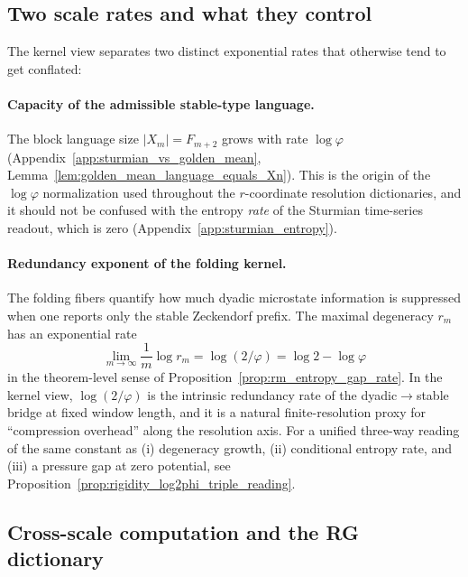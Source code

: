 \subsection{Two scale rates and what they control}
\label{subsec:kernel_scale_rates}

The kernel view separates two distinct exponential rates that otherwise tend to get conflated:

\paragraph{Capacity of the admissible stable-type language.}
The block language size $|X_m|=F_{m+2}$ grows with rate $\log\varphi$ (Appendix~\ref{app:sturmian_vs_golden_mean}, Lemma~\ref{lem:golden_mean_language_equals_Xn}).
This is the origin of the $\log\varphi$ normalization used throughout the $r$-coordinate resolution dictionaries, and it should not be confused with the entropy \emph{rate} of the Sturmian time-series readout, which is zero (Appendix~\ref{app:sturmian_entropy}).

\paragraph{Redundancy exponent of the folding kernel.}
The folding fibers quantify how much dyadic microstate information is suppressed when one reports only the stable Zeckendorf prefix.
The maximal degeneracy $r_m$ has an exponential rate
\[
\lim_{m\to\infty}\frac{1}{m}\log r_m=\log(2/\varphi)=\log 2-\log\varphi
\]
in the theorem-level sense of Proposition~\ref{prop:rm_entropy_gap_rate}.
In the kernel view, $\log(2/\varphi)$ is the intrinsic redundancy rate of the dyadic$\to$stable bridge at fixed window length, and it is a natural finite-resolution proxy for ``compression overhead'' along the resolution axis.
\AuditTag For a unified three-way reading of the same constant as (i) degeneracy growth, (ii) conditional entropy rate, and (iii) a pressure gap at zero potential, see Proposition~\ref{prop:rigidity_log2phi_triple_reading}.

\subsection{Cross-scale computation and the RG dictionary}
\label{subsec:kernel_cross_scale_computation}

